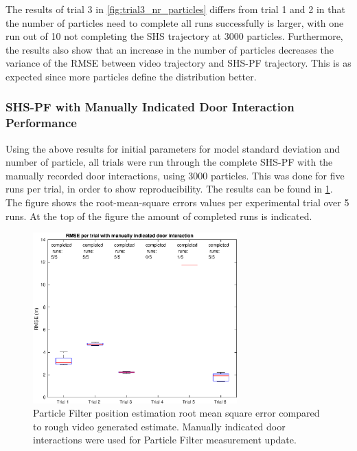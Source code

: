The results of trial 3 in \cref{fig:trial3_nr_particles} differs from trial 1 and 2 in that the number of particles need to complete all runs successfully is larger, with one run out of 10 not completing the SHS trajectory at 3000 particles. Furthermore, the results also show that an increase in the number of particles decreases the variance of the RMSE between video trajectory and SHS-PF trajectory. This is as expected since more particles define the distribution better. %
\par 

\subsubsection{SHS-PF with Manually Indicated Door Interaction Performance}
Using the above results for initial parameters for model standard deviation and number of particle, all trials were run through the complete SHS-PF with the manually recorded door interactions, using 3000 particles. This was done for five runs per trial, in order to show reproducibility. The results can be found in \cref{fig:pf_boxplot}. The figure shows the root-mean-square errors values per experimental trial over 5 runs. At the top of the figure the amount of completed runs is indicated.

\begin{figure}[H]
	\centering
	\includegraphics[width=0.7\textwidth]{images/20201201_1850_RMSE_per_trial_with_manually_indicated_door_interaction}
	\caption[Particle Filter position estimation performance with manual door interaction]{Particle Filter position estimation root mean square error compared to rough video generated estimate. Manually indicated door interactions were used for Particle Filter measurement update.}	
	\label{fig:pf_boxplot}
\end{figure}


